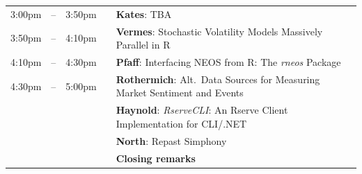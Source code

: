 \documentclass[11pt]{article}
\begin{document}
\begin{tabular}{rlrlp{5in}}
   3:00pm & -- & 3:50pm  &   & \textbf{\color{KeynoteTalk} Kates}: \small{TBA} \\
   3:50pm & -- & 4:10pm  &   & \textbf{\color{Talk} Vermes}: \small{Stochastic Volatility Models Massively Parallel in R} \\
   4:10pm & -- & 4:30pm  &   & \textbf{\color{Talk} Pfaff}: \small{Interfacing NEOS from R: The \emph{rneos} Package} \\
   4:30pm & -- & 5:00pm  &   & \textbf{\color{LightningTalk} Rothermich}: \small{Alt.~Data Sources for Measuring Market Sentiment and Events} \\
          &    &        &    & \textbf{\color{LightningTalk} Haynold}: \small{\emph{RserveCLI}: An Rserve Client Implementation for CLI/.NET} \\
          &    &         &   & \textbf{\color{LightningTalk} North}: \small{Repast Simphony} \\
          &    &         &   & \textbf{\color{Breaks} Closing remarks} \\
\end{tabular}
\end{document}
